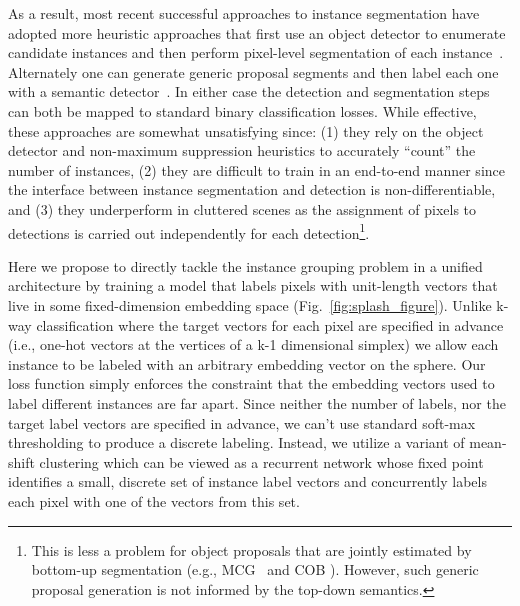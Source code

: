 \documentclass[10pt,twocolumn,letterpaper]{article}
\begin{document}
As a result, most recent successful approaches to instance segmentation have
adopted more heuristic approaches that first use an object detector to
enumerate candidate instances and then perform pixel-level segmentation of each
instance~\cite{liang2015proposal, dai2016instance, li2016fully,
liang2016reversible, arnab2017pixelwise}.  Alternately one can generate generic
proposal segments and then label each one with a semantic
detector~\cite{hariharan2014simultaneous, chen2015multi,
hariharan2015hypercolumns, dai2015convolutional, uhrig2016pixel, he2017mask}.
In either case the detection and segmentation steps can both be mapped to
standard binary classification losses.  While effective, these approaches are
somewhat unsatisfying since: (1) they rely on the object detector and
non-maximum suppression heuristics to accurately ``count'' the number of
instances, (2) they are difficult to train in an end-to-end manner since the
interface between instance segmentation and detection is non-differentiable,
and (3) they underperform in cluttered scenes as the assignment of pixels to
detections is carried out independently for each detection\footnote{This is
less a problem for object proposals that are jointly estimated by bottom-up
segmentation (e.g., MCG~\cite{pont2017multiscale} and COB
\cite{maninis2017convolutional}).  However, such generic proposal generation is
not informed by the top-down semantics.}.

Here we propose to directly tackle the instance grouping problem in a unified
architecture by training a model that labels pixels with unit-length vectors
that live in some fixed-dimension embedding space
(Fig.~\ref{fig:splash_figure}).  Unlike k-way classification where the target
vectors for each pixel are specified in advance (i.e., one-hot vectors at the
vertices of a k-1 dimensional simplex) we allow each instance to be labeled
with an arbitrary embedding vector on the sphere.  Our loss function simply
enforces the constraint that the embedding vectors used to label different
instances are far apart.  Since neither the number of labels, nor the target
label vectors are specified in advance, we can't use standard soft-max
thresholding to produce a discrete labeling.  Instead, we utilize a
variant of mean-shift clustering which can be viewed as a recurrent network
whose fixed point identifies a small, discrete set of instance label vectors
and concurrently labels each pixel with one of the vectors from this set.
\end{document}
